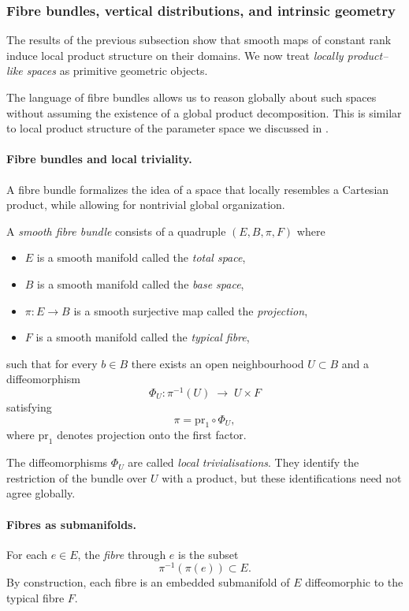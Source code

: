 \subsubsection{Fibre bundles, vertical distributions, and intrinsic geometry}
\label{subsec:background_fibre_bundles}

The results of the previous subsection show that smooth maps of constant rank induce
local product structure on their domains.
We now treat \emph{locally product--like spaces} as
primitive geometric objects.

The language of fibre bundles allows us to reason globally about such spaces without
assuming the existence of a global product decomposition.
This is similar to local product structure of the parameter space we discussed in .

\paragraph{Fibre bundles and local triviality.}
A fibre bundle formalizes the idea of a space that locally resembles a Cartesian product,
while allowing for nontrivial global organization.

\begin{gdefn}
A \emph{smooth fibre bundle} consists of a quadruple $(E,B,\pi,F)$ where
\begin{itemize}
\item $E$ is a smooth manifold called the \emph{total space},
\item $B$ is a smooth manifold called the \emph{base space},
\item $\pi:E\to B$ is a smooth surjective map called the \emph{projection},
\item $F$ is a smooth manifold called the \emph{typical fibre},
\end{itemize}
such that for every $b\in B$ there exists an open neighbourhood $U\subset B$ and a
diffeomorphism
\[
\Phi_U : \pi^{-1}(U) \;\longrightarrow\; U \times F
\]
satisfying
\[
\pi = \mathrm{pr}_1 \circ \Phi_U,
\]
where $\mathrm{pr}_1$ denotes projection onto the first factor.
\end{gdefn}

The diffeomorphisms $\Phi_U$ are called \emph{local trivialisations}.
They identify the restriction of the bundle over $U$ with a product, but these
identifications need not agree globally.

\paragraph{Fibres as submanifolds.}
For each $e\in E$, the \emph{fibre} through $e$ is the subset
\[
\pi^{-1}(\pi(e)) \subset E.
\]
By construction, each fibre is an embedded submanifold of $E$ diffeomorphic to the
typical fibre $F$.


